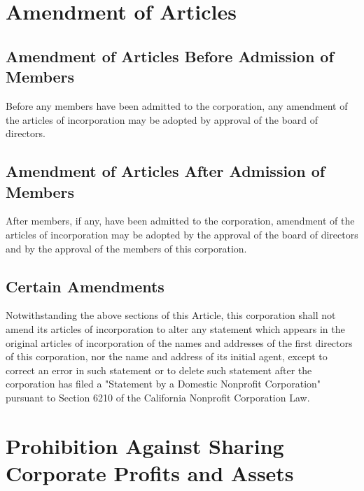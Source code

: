 \documentclass{article}
\begin{document}
	\section{Amendment of Articles}	
	\subsection{Amendment of Articles Before Admission of Members}
	Before any members have been admitted to the corporation, any amendment of the articles of incorporation may be adopted by approval of the board of directors.
	\subsection{Amendment of Articles After Admission of Members}
	After members, if any, have been admitted to the corporation, amendment of the articles of incorporation may be adopted by the approval of the board of directors and by the approval of the members of this corporation.
	\subsection{Certain Amendments}
	Notwithstanding the above sections of this Article, this corporation shall not amend its articles of incorporation to alter any statement which appears in the original articles of incorporation of the names and addresses of the first directors of this corporation, nor the name and address of its initial agent, except to correct an error in such statement or to delete such statement after the corporation has filed a "Statement by a Domestic Nonprofit Corporation" pursuant to Section 6210 of the California Nonprofit Corporation Law.
	
	\section{Prohibition Against Sharing Corporate Profits and Assets}
\end{document}
